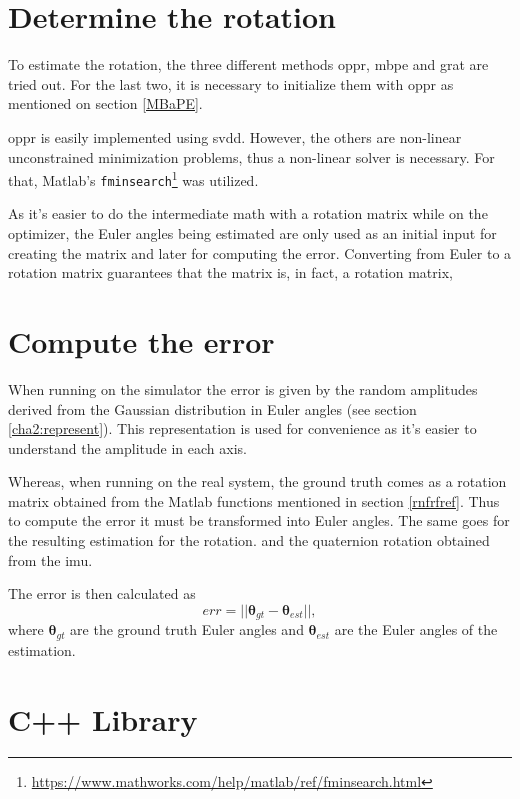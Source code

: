 \section{Determine the rotation}
To estimate the rotation, the three different methods \acrshort{oppr}, \acrshort{mbpe} and \acrshort{grat} are tried out. For the last two, it is necessary to initialize them with \acrshort{oppr} as mentioned on section \ref{MBaPE}. 

\acrshort{oppr} is easily implemented using \acrshort{svdd}. However, the others are non-linear unconstrained minimization problems, thus a non-linear solver is necessary. For that, Matlab's \texttt{fminsearch}\footnote{\href{https://www.mathworks.com/help/matlab/ref/fminsearch.html}{https://www.mathworks.com/help/matlab/ref/fminsearch.html}} was utilized.

As it's easier to do the intermediate math with a rotation matrix while on the optimizer, the Euler angles being estimated are only used as an initial input for creating the matrix and later for computing the error.
Converting from Euler to a rotation matrix guarantees that the matrix is, in fact, a rotation matrix,

\section{Compute the error}
When running on the simulator the error is given by the random amplitudes derived from the Gaussian distribution in Euler angles (see section \ref{cha2:represent}). This representation is used for convenience as it's easier to understand the amplitude in each axis.

Whereas, when running on the real system, the ground truth comes as a rotation matrix obtained from the Matlab functions mentioned in section \ref{rnfrfref}. Thus to compute the error it must be transformed into Euler angles. The same goes for the resulting estimation for the rotation. and the quaternion rotation obtained from the \acrshort{imu}.

The error is then calculated as
\begin{equation}
	err = ||{\mathbf{ \theta}_{gt}-\mathbf{ \theta}_{est}}||,
\end{equation}
where $\mathbf{ \theta}_{gt}$ are the ground truth Euler angles and $\mathbf{ \theta}_{est}$ are the Euler angles of the estimation.


\section{C++ Library}


